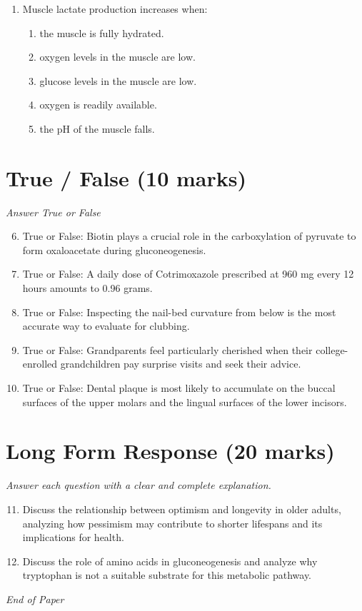 \documentclass[12pt]{article}
\begin{document}
\begin{enumerate}[label=\arabic*.]
\begin{enumerate}[label=(\alph*)]
    \item Aunt
    \item Nephew
    \item Brother
    \item Grandchild
    \item Great-grandchild
\end{enumerate}
\item Muscle lactate production increases when:
\begin{enumerate}[label=(\alph*)]
    \item the muscle is fully hydrated.
    \item oxygen levels in the muscle are low.
    \item glucose levels in the muscle are low.
    \item oxygen is readily available.
    \item the pH of the muscle falls.
\end{enumerate}
\end{enumerate}

\section*{True / False (10 marks)}
\textit{Answer True or False}
\begin{enumerate}[label=\arabic*.]
\setcounter{enumi}{5}
\item True or False: Biotin plays a crucial role in the carboxylation of pyruvate to form oxaloacetate during gluconeogenesis.
\item True or False: A daily dose of Cotrimoxazole prescribed at 960 mg every 12 hours amounts to 0.96 grams.
\item True or False: Inspecting the nail-bed curvature from below is the most accurate way to evaluate for clubbing.
\item True or False: Grandparents feel particularly cherished when their college-enrolled grandchildren pay surprise visits and seek their advice.
\item True or False: Dental plaque is most likely to accumulate on the buccal surfaces of the upper molars and the lingual surfaces of the lower incisors.
\end{enumerate}

\section*{Long Form Response (20 marks)}
\textit{Answer each question with a clear and complete explanation.}
\begin{enumerate}[label=\arabic*.]
\setcounter{enumi}{10}
\item Discuss the relationship between optimism and longevity in older adults, analyzing how pessimism may contribute to shorter lifespans and its implications for health.
\item Discuss the role of amino acids in gluconeogenesis and analyze why tryptophan is not a suitable substrate for this metabolic pathway.
\end{enumerate}

\vfill
\noindent\textit{End of Paper}
\end{document}
